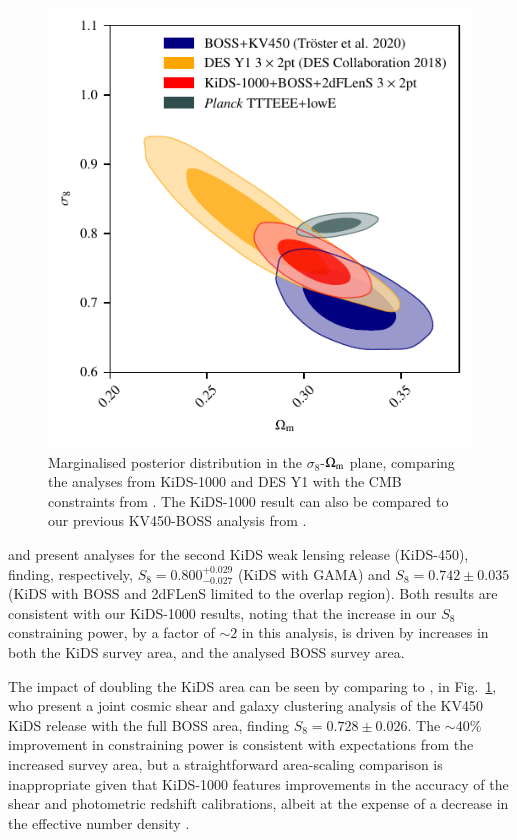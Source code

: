 \begin{figure}
	\begin{center}
		\includegraphics[width=\columnwidth]{Parameter_Plots/cosmology/omegam_sigma8_survey_comparison}
		\caption{Marginalised posterior distribution in the $\sigma_8$-$\Omega_{\rm m}$ plane, comparing the \tttp analyses from KiDS-1000 and DES Y1 \citep{abbott/etal:2018} with the CMB constraints from \citet{planck/etal:2018}.   The KiDS-1000 \tttp result can also be compared to our previous KV450-BOSS analysis from \citet{troester/etal:2020}. 
		\label{fig:DES_KiDS_comp}}
	\end{center}
\end{figure}

\citet{vanuitert/etal:2018} and \citet{joudaki/etal:2018} present \tttp analyses for the second KiDS weak lensing release (KiDS-450), finding, respectively, $S_8 = 0.800_{-0.027}^{+0.029}$ (KiDS with GAMA) and $S_8 = 0.742 \pm 0.035$ (KiDS with BOSS and 2dFLenS limited to the overlap region). 
Both results are consistent with our KiDS-1000 results, noting that the increase in our $S_8$ constraining power, by a factor of $\sim\! 2$ in this analysis, is driven by increases in both the KiDS survey area, and the analysed BOSS survey area.  

The impact of doubling the KiDS area can be seen by comparing to \citet{troester/etal:2020}, in Fig.~\ref{fig:DES_KiDS_comp}, who present a joint cosmic shear and galaxy clustering analysis of the KV450 KiDS release with the full BOSS area, finding $S_8 = 0.728 \pm 0.026$.   The $\sim\!40\%$ improvement in constraining power is consistent with expectations from the increased survey area, but a straightforward area-scaling comparison is inappropriate given that KiDS-1000 features improvements in the accuracy of the shear and photometric redshift calibrations, albeit at the expense of a decrease in the effective number density \citep[see][for details]{giblin/etal:inprep,hildebrandt/etal:inprep}.  

